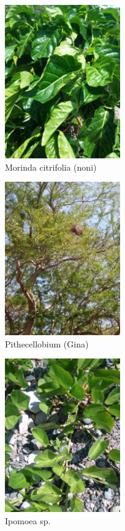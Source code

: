 \documentclass[11pt,]{article}
\begin{document}
\begin{figure}
\centering
\includegraphics[height=2.60417in]{None.jpeg}
\caption{Morinda citrifolia (noni)\label{None}}
\end{figure}

\begin{figure}
\centering
\includegraphics[height=2.60417in]{Gina.jpeg}
\caption{Pithecellobium (Gina)\label{gina}}
\end{figure}

\begin{figure}
\centering
\includegraphics[height=2.60417in]{Ipomea.jpeg}
\caption{Ipomoea sp. \label{Ipomea}}
\end{figure}
\end{document}
